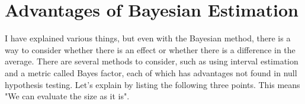 \documentclass{ltjbook}
\begin{document}
\section{Advantages of Bayesian Estimation}
I have explained various things, but even with the Bayesian method, there is a way to consider whether there is an effect or whether there is a difference in the average.
There are several methods to consider, such as using interval estimation and a metric called Bayes factor, each of which has advantages not found in null hypothesis testing. Let's explain by listing the following three points.
This means "We can evaluate the size as it is".
\end{document}
